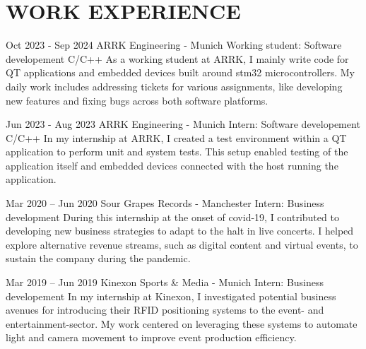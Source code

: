
\section{WORK EXPERIENCE}




\jobentry
	{Oct 2023 - Sep 2024} %
	{} %
	{ARRK Engineering - Munich} %
	{Working student: Software developement C/C++} %
	{As a working student at ARRK, I mainly write code for QT applications and embedded devices built around stm32 microcontrollers. My daily work includes addressing tickets for various assignments, like developing new features and fixing bugs across both software platforms.} %

\jobentry
	{Jun 2023 - Aug 2023} %
	{} %
	{ARRK Engineering - Munich} %
	{Intern: Software developement C/C++} %
	{In my internship at ARRK, I created a test environment within a QT application to perform unit and system tests. This setup enabled testing of the application itself and embedded devices connected with the host running the application.} %

\jobentry
	{Mar 2020 -- Jun 2020} %
	{} %
	{Sour Grapes Records - Manchester} %
	{Intern: Business development} %
	{During this internship at the onset of covid-19, I contributed to developing new business strategies to adapt to the halt in live concerts. I helped explore alternative revenue streams, such as digital content and virtual events, to sustain the company during the pandemic.} %

\jobentry
	{Mar 2019 -- Jun 2019} %
	{} %
	{Kinexon Sports \& Media - Munich} %
	{Intern: Business developement} %
	{In my internship at Kinexon, I investigated potential business avenues for introducing their RFID positioning systems to the event- and entertainment-sector. My work centered on leveraging these systems to automate light and camera movement to improve event production efficiency. } %

